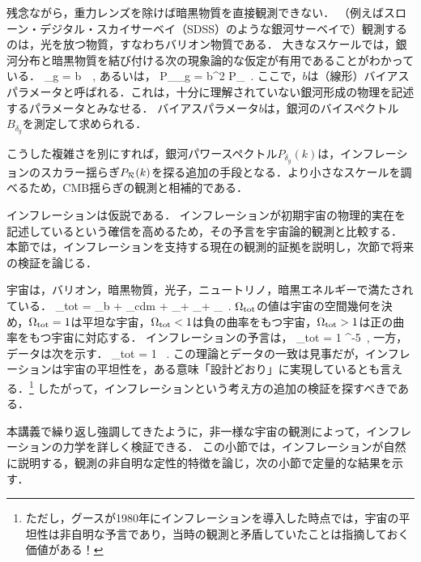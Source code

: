 
残念ながら，重力レンズを除けば暗黒物質を直接観測できない．
（例えばスローン・デジタル・スカイサーベイ（SDSS）のような銀河サーベイで）観測するのは，光を放つ物質，すなわちバリオン物質である．
大きなスケールでは，銀河分布と暗黒物質を結び付ける次の現象論的な仮定が有用であることがわかっている．
\beq
\delta_g = b\, \delta\, ,
\eeq
あるいは，
\beq
P_{\delta_g} = b^2 P_\delta\, .
\eeq
ここで，$b$は（線形）バイアスパラメータと呼ばれる．これは，十分に理解されていない銀河形成の物理を記述するパラメータとみなせる．
バイアスパラメータ$b$は，銀河のバイスペクトル$B_{\delta_g}$を測定して求められる．

こうした複雑さを別にすれば，銀河パワースペクトル$P_{\delta_g}(k)$は，インフレーションのスカラー揺らぎ$P_{\cal R}(k)$を探る追加の手段となる．より小さなスケールを調べるため，CMB揺らぎの観測と相補的である．

{}
\label{sec:evidence}

インフレーションは仮説である．
インフレーションが初期宇宙の物理的実在を記述しているという確信を高めるため，その予言を宇宙論的観測と比較する．
本節では，インフレーションを支持する現在の観測的証拠を説明し，次節で将来の検証を論じる．



宇宙は，バリオン，暗黒物質，光子，ニュートリノ，暗黒エネルギーで満たされている．
\beq
\Omega_{\rm tot} = \Omega_b + \Omega_{\rm cdm} + \Omega_\gamma + \Omega_\nu + \Omega_\Lambda\, .
\eeq
$\Omega_{\rm tot}$の値は宇宙の空間幾何を決め，$\Omega_{\rm tot}=1$は平坦な宇宙，$\Omega_{\rm tot} < 1$は負の曲率をもつ宇宙，$\Omega_{\rm tot} > 1$は正の曲率をもつ宇宙に対応する．
インフレーションの予言は，
\beq
\Omega_{\rm tot} = 1 ^{-5}\, ,
\eeq
一方，データは次を示す\cite{WMAP5}．
\beq
\Omega_{\rm tot} = 1 \, .
\eeq
この理論とデータの一致は見事だが，インフレーションは宇宙の平坦性を，ある意味「設計どおり」に実現しているとも言える．\footnote{ただし，グースが1980年にインフレーションを導入した時点では，宇宙の平坦性は非自明な予言であり，当時の観測と矛盾していたことは指摘しておく価値がある！}
したがって，インフレーションという考え方の追加の検証を探すべきである．



本講義で繰り返し強調してきたように，非一様な宇宙の観測によって，インフレーションの力学を詳しく検証できる．
この小節では，インフレーションが自然に説明する，観測の非自明な定性的特徴を論じ，次の小節で定量的な結果を示す．

